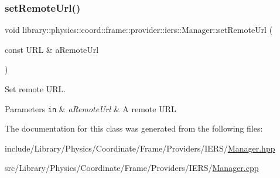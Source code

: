 \subsubsection{\texorpdfstring{set\+Remote\+Url()}{setRemoteUrl()}}
{\footnotesize\ttfamily void library\+::physics\+::coord\+::frame\+::provider\+::iers\+::\+Manager\+::set\+Remote\+Url (\begin{DoxyParamCaption}\item[{const U\+RL \&}]{a\+Remote\+Url }\end{DoxyParamCaption})}



Set remote U\+RL. 


\begin{DoxyParams}[1]{Parameters}
\mbox{\tt in}  & {\em a\+Remote\+Url} & A remote U\+RL \\
\hline
\end{DoxyParams}


The documentation for this class was generated from the following files\+:\begin{DoxyCompactItemize}
\item 
include/\+Library/\+Physics/\+Coordinate/\+Frame/\+Providers/\+I\+E\+R\+S/\hyperlink{_coordinate_2_frame_2_providers_2_i_e_r_s_2_manager_8hpp}{Manager.\+hpp}\item 
src/\+Library/\+Physics/\+Coordinate/\+Frame/\+Providers/\+I\+E\+R\+S/\hyperlink{_coordinate_2_frame_2_providers_2_i_e_r_s_2_manager_8cpp}{Manager.\+cpp}\end{DoxyCompactItemize}
